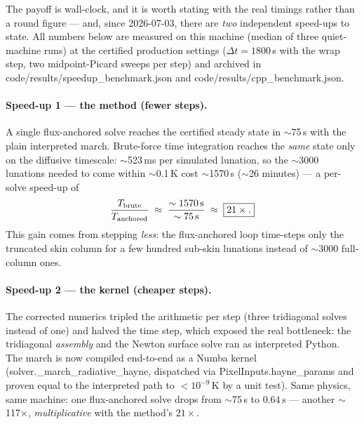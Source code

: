 \documentclass[11pt]{report}
\newcommand{\code}[1]{{\ttfamily\small #1}}
\begin{document}
The payoff is wall-clock, and it is worth stating with the real timings
rather than a round figure --- and, since 2026-07-03, there are \emph{two}
independent speed-ups to state. All numbers below are measured on this
machine (median of three quiet-machine runs) at the certified production
settings ($\Delta t = 1800$\,s with the wrap step, two midpoint-Picard
sweeps per step) and archived in \code{code/results/speedup\_benchmark.json}
and \code{code/results/cpp\_benchmark.json}.

\paragraph{\textbf{Speed-up 1 --- the method (fewer steps).}} A single
flux-anchored solve reaches the certified steady state in $\sim$75\,s with
the plain interpreted march. Brute-force time integration reaches the
\emph{same} state only on the diffusive timescale: $\sim$523\,ms per
simulated lunation, so the $\sim$3000 lunations needed to come within
$\sim$0.1\,K cost $\sim$1570\,s ($\sim$26 minutes) --- a per-solve
speed-up of
\[
\frac{T_{\rm brute}}{T_{\rm anchored}}
\;\approx\;\frac{\sim 1570\,\text{s}}{\sim 75\,\text{s}}
\;\approx\;\boxed{21\times.}
\]
This gain comes from stepping \emph{less}: the flux-anchored loop
time-steps only the truncated skin column for a few hundred sub-skin
lunations instead of $\sim$3000 full-column ones.

\paragraph{\textbf{Speed-up 2 --- the kernel (cheaper steps).}} The
corrected numerics tripled the arithmetic per step (three tridiagonal
solves instead of one) and halved the time step, which exposed the real
bottleneck: the tridiagonal \emph{assembly} and the Newton surface solve
ran as interpreted Python. The march is now compiled end-to-end as a Numba
kernel (\code{solver.\_march\_radiative\_hayne}, dispatched via
\code{PixelInputs.hayne\_params} and proven equal to the interpreted path
to $<10^{-9}$\,K by a unit test). Same physics, same machine: one
flux-anchored solve drops from $\sim$75\,s to $\boxed{0.64\,\text{s}}$ ---
another $\sim$117$\times$, \emph{multiplicative} with the method's
$21\times$.
\end{document}
